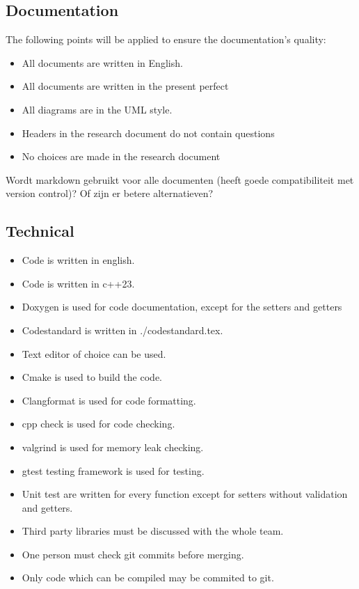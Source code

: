 \documentclass{article} %
\begin{document}
\subsection{Documentation}
The following points will be applied to ensure the documentation’s quality:
\begin{itemize}
    \item All documents are written in English.
    \item All documents are written in the present perfect
    \item All diagrams are in the UML style.
    \item Headers in the research document do not contain questions
    \item No choices are made in the research document
\end{itemize}
Wordt markdown gebruikt voor alle documenten (heeft goede compatibiliteit met version control)? Of zijn er betere alternatieven?
\subsection{Technical}
\begin{itemize}
    \item Code is written in english.
    \item Code is written in c++23.
    \item Doxygen is used for code documentation, except for the setters and getters
    \item Codestandard is written in ./codestandard.tex.
    \item Text editor of choice can be used.
    \item Cmake is used to build the code.
    \item Clangformat is used for code formatting.
    \item cpp check is used for code checking.
    \item valgrind is used for memory leak checking.
    \item gtest testing framework is used for testing.
    \item Unit test are written for every function except for setters without validation and getters.
    \item Third party libraries must be discussed with the whole team.
    \item One person must check git commits before merging.
    \item Only code which can be compiled may be commited to git.
\end{itemize}
\end{document}
